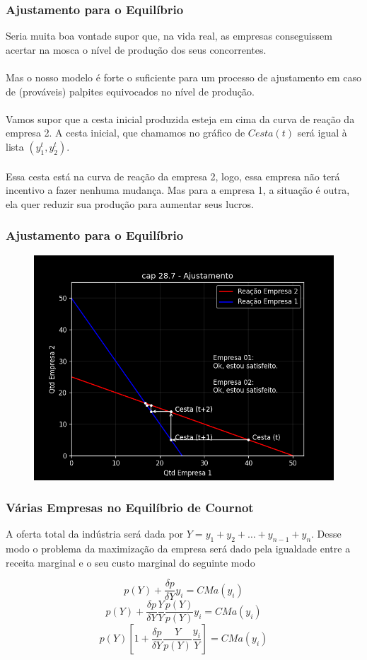 \documentclass{beamer}[10]
\begin{document}
\begin{frame}
	\frametitle{Ajustamento para o Equilíbrio}

	Seria muita boa vontade supor que, na vida real, as empresas conseguissem acertar na mosca o nível de produção dos seus concorrentes. 
	\\~\\
	Mas o nosso modelo é forte o suficiente para um processo de ajustamento em caso de (prováveis) palpites equivocados no nível de produção.
	\\~\\
	Vamos supor que a cesta inicial produzida esteja em cima da curva de reação da empresa 2. A cesta inicial, que chamamos no gráfico de $Cesta(t)$ será igual à lista $(y_1^t,y_2^t)$.
	\\~\\
	Essa cesta está na curva de reação da empresa 2, logo, essa empresa não terá incentivo a fazer nenhuma mudança. Mas para a empresa 1, a situação é outra, ela quer reduzir sua produção para aumentar seus lucros.

\end{frame}

\begin{frame}
	\frametitle{Ajustamento para o Equilíbrio}

	\begin{figure}[H]
		\centering
		\includegraphics[scale=0.55]{cap28_7-ajustamento.png}
	\end{figure}

\end{frame}


\begin{frame}
	\frametitle{Várias Empresas no Equilíbrio de Cournot}

	A oferta total da indústria será dada por $Y = y_1 + y_2 + \dots + y_{n-1} + y_n$. Desse modo o problema da maximização da empresa será dado pela igualdade entre a receita marginal e o seu custo marginal do seguinte modo

	$$ p(Y) + \frac{\delta p}{\delta Y} y_i = CMa(y_i) $$
	$$ p(Y) + \frac{\delta p}{\delta Y} \frac{Y}{Y} \frac{p(Y)}{p(Y)} y_i = CMa(y_i) $$
	$$ p(Y) \left[1 + \frac{\delta p}{\delta Y} \frac{Y}{p(Y)} \frac{y_i}{Y} \right] = CMa(y_i) $$

\end{frame}
\end{document}
